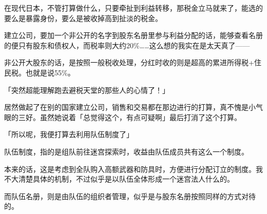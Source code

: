 在现代日本，不管打算做什么，只要牵扯到利益转移，那税金立马就来了，能选的要么是暴露身份，要么是被收掉高到扯淡的税金。

建立公司，要加一个非公开的名字到股东名册里参与利益分配的话，能够查看名册的便只有股东和债权人，而税率则大约20\%……这么想的我实在是太天真了——

非公开大股东的话，是按照一般税收处理，分红时收的则是超高的累进所得税+住民税。也就是说55\%。

「突然超能理解跑去避税天堂的那些人的心情了！」

居然做起了在别的国家建立公司，销售和交易都在那边进行的打算，真不愧是小气眼的三好。虽然她说着「总觉得这个，有点可疑啊」最后打消了这个打算。

「所以呢，我便打算去利用队伍制度了」

队伍制度，指的是组队前往迷宫探索时，收益由队伍成员共有这么一个制度。

本来的话，这是考虑到全队购入高额武器和防具时，方便进行分配订立的制度。我不大清楚具体的机制，不过似乎是以队伍全体形成一个迷宫法人什么的。

而队伍名册，则是由队伍的组织者管理，似乎是与股东名册按照同样的方式对待的。

